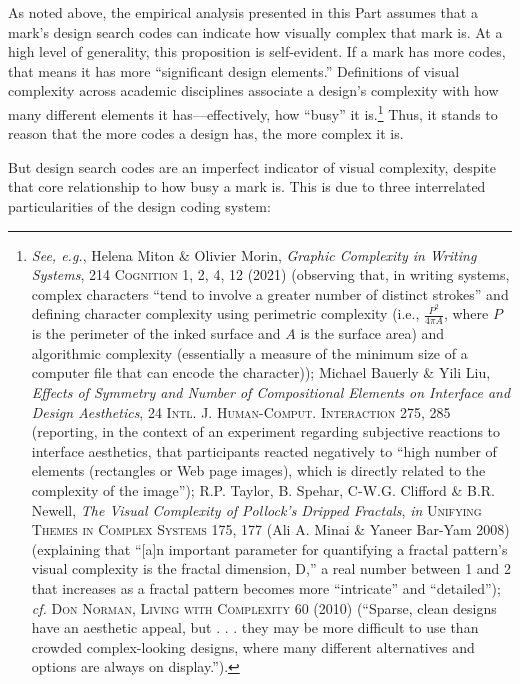 \documentclass[letterpaper, 11pt, oneside]{article}
\begin{document}
As noted above, the empirical analysis presented in this Part assumes that a mark's design search codes can indicate how visually complex that mark is. At a high level of generality, this proposition is self-evident. If a mark has more codes, that means it has more ``significant design elements.'' Definitions of visual complexity across academic disciplines associate a design's complexity with how many different elements it has—effectively, how ``busy'' it is.\footnote{\label{supra24} \textit{See, e.g.}, Helena Miton \& Olivier Morin, \textit{Graphic Complexity in Writing Systems}, 214 \textsc{Cognition} 1, 2, 4, 12 (2021) (observing that, in writing systems, complex characters ``tend to involve a greater number of distinct strokes'' and defining character complexity using perimetric complexity (i.e., $\frac{P^2}{4{\pi}A}$, where $P$ is the perimeter of the inked surface and $A$ is the surface area) and algorithmic complexity (essentially a measure of the minimum size of a computer file that can encode the character)); Michael Bauerly \& Yili Liu, \textit{Effects of Symmetry and Number of Compositional Elements on Interface and Design Aesthetics}, 24 \textsc{Intl. J. Human-Comput. Interaction} 275, 285 (reporting, in the context of an experiment regarding subjective reactions to interface aesthetics, that participants reacted negatively to ``high number of elements (rectangles or Web page images), which is directly related to the complexity of the image''); R.P. Taylor, B. Spehar, C-W.G. Clifford \& B.R. Newell, \textit{The Visual Complexity of Pollock's Dripped Fractals}, \textit{in} \textsc{Unifying Themes in Complex Systems} 175, 177 (Ali A. Minai \& Yaneer Bar-Yam 2008) (explaining that ``[a]n important parameter for quantifying a fractal pattern's visual complexity is the fractal dimension, D,'' a real number between 1 and 2 that increases as a fractal pattern becomes more ``intricate'' and ``detailed''); \textit{cf.} \textsc{Don Norman, Living with Complexity} 60 (2010) (``Sparse, clean designs have an aesthetic appeal, but . . . they may be more difficult to use than crowded complex-looking designs, where many different alternatives and options are always on display.''). } Thus, it stands to reason that the more codes a design has, the more complex it is.

But design search codes are an imperfect indicator of visual complexity, despite that core relationship to how busy a mark is. This is due to three interrelated particularities of the design coding system:
\end{document}
